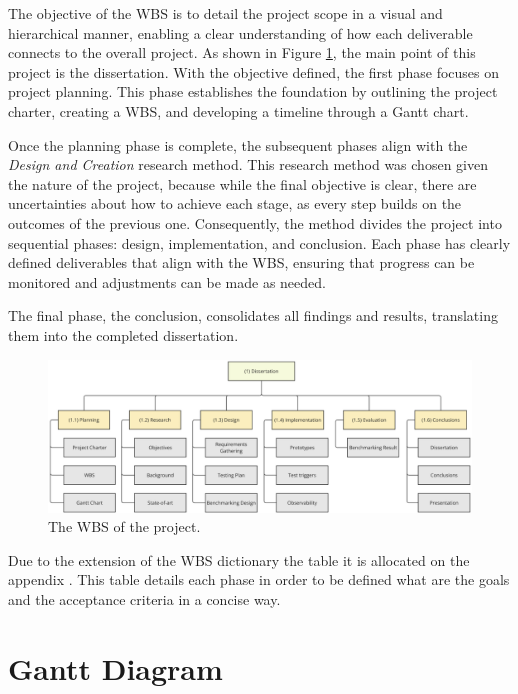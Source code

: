 The objective of the \gls{WBS} is to detail the project scope in a visual and hierarchical manner, enabling a clear understanding of how each deliverable connects to the overall project.
As shown in Figure \ref{fig:wbs}, the main point of this project is the dissertation. With the objective defined, the first phase focuses on project planning. This phase establishes the foundation by outlining the project charter, creating a \gls{WBS}, and developing a timeline through a Gantt chart.

Once the planning phase is complete, the subsequent phases align with the \textit{Design and Creation} research method. This research method was chosen given the nature of the project, because while the final objective is clear, there are uncertainties about how to achieve each stage, as every step builds on the outcomes of the previous one. Consequently, the method divides the project into sequential phases: design, implementation, and conclusion. Each phase has clearly defined deliverables that align with the \gls{WBS}, ensuring that progress can be monitored and adjustments can be made as needed.

The final phase, the conclusion, consolidates all findings and results, translating them into the completed dissertation.

\begin{figure}
      \centering
      \includegraphics[width=\linewidth]{ch-planning/assets/wbs.png}
      \caption{The WBS of the project.}
      \label{fig:wbs}
\end{figure}

Due to the extension of the \gls{WBS} dictionary the table it is allocated on the appendix . This table details each phase in order to be defined what are the goals and the acceptance criteria in a concise way. 

\section{Gantt Diagram}


